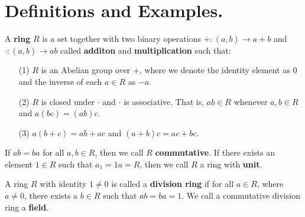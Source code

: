 
\section{Definitions and Examples.}
\label{section1}

\begin{definition}
    A \textbf{ring} $R$ is a set together with two binary operations  $+:(a,b)
    \xrightarrow{} a+b$ and $\cdot:(a,b) \xrightarrow{} ab$ called
    \textbf{additon} and \textbf{multiplication} such that:
    \begin{enumerate}
        \item[(1)] $R$ is an Abelian group over $+$, where we denote the
            identity element as $0$ and the inverse of each $a \in R$ as $-a$.

        \item[(2)] $R$ is closed under  $\cdot$ and  $\cdot$ is associative.
            That is, $ab \in R$ whenever  $a,b \in R$ and  $a(bc)=(ab)c$.

        \item[(3)] $a(b+c)=ab+ac$ and $(a+b)c=ac+bc$.
    \end{enumerate}
    If $ab=ba$ for all  $a,b \in R$, then we call $R$ \textbf{commutative}. If
    there exists an element $1 \in R$ such that  $a_1=1a=R$, then we call $R$ a
    ring with  \textbf{unit}.
\end{definition}

\begin{definition}
    A ring $R$ with identity $1 \neq 0$ is called a \textbf{division ring} if
    for all $a \in R$, where  $a \neq 0$, there exists a  $b \in R$ such that
    $ab=ba=1$. We call a commutative division ring a \textbf{field}.
\end{definition}

